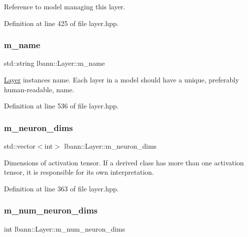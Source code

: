 Reference to model managing this layer. 

Definition at line 425 of file layer.\+hpp.

\mbox{\label{classlbann_1_1Layer_aa47109ad09b399142fa92f9d3702189f}} 
\subsubsection{\texorpdfstring{m\+\_\+name}{m\_name}}
{\footnotesize\ttfamily std\+::string lbann\+::\+Layer\+::m\+\_\+name\hspace{0.3cm}{\ttfamily [protected]}}

\hyperlink{classlbann_1_1Layer}{Layer} instance\textquotesingle{}s name. Each layer in a model should have a unique, preferably human-\/readable, name. 

Definition at line 536 of file layer.\+hpp.

\mbox{\label{classlbann_1_1Layer_abb34bb8031f57a483e2e327a5f229f48}} 
\subsubsection{\texorpdfstring{m\+\_\+neuron\+\_\+dims}{m\_neuron\_dims}}
{\footnotesize\ttfamily std\+::vector$<$int$>$ lbann\+::\+Layer\+::m\+\_\+neuron\+\_\+dims\hspace{0.3cm}{\ttfamily [protected]}}

Dimensions of activation tensor. If a derived class has more than one activation tensor, it is responsible for its own interpretation. 

Definition at line 363 of file layer.\+hpp.

\mbox{\label{classlbann_1_1Layer_adfd6178d21498c9095cd947ae1eb2d6a}} 
\subsubsection{\texorpdfstring{m\+\_\+num\+\_\+neuron\+\_\+dims}{m\_num\_neuron\_dims}}
{\footnotesize\ttfamily int lbann\+::\+Layer\+::m\+\_\+num\+\_\+neuron\+\_\+dims\hspace{0.3cm}{\ttfamily [protected]}}

